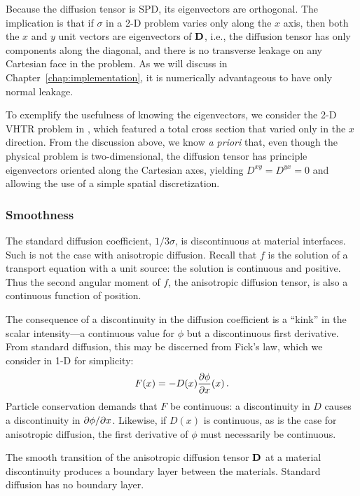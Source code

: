 Because the diffusion tensor is SPD, its eigenvectors are orthogonal. The
implication is that if $\sigma$ in a 2-D problem varies only along
the $x$ axis, then both the $x$ and $y$ unit vectors are
eigenvectors of $\mathbf{D}$, i.e., the diffusion tensor has only
components along the diagonal, and there is no transverse leakage on any
Cartesian face in the problem. As we will discuss in
Chapter~\ref{chap:implementation}, it is numerically advantageous to have only
normal leakage.

To exemplify the usefulness of knowing the eigenvectors, we consider the 2-D
VHTR problem in \cite{Lar2009c}, which featured a total cross section that
varied only in the $x$ direction. From the discussion above, we know
\emph{a priori} that, even though the physical problem is two-dimensional,
the diffusion tensor has principle
eigenvectors oriented along the Cartesian axes, yielding $D^{xy}=D^{yx}=0$ and
allowing the use of a simple spatial discretization.

\subsubsection{Smoothness}

The standard diffusion coefficient, $1/3\sigma$, is discontinuous at material
interfaces. Such is not the case with anisotropic diffusion. Recall that $f$ is
the solution of a transport equation with a unit source: the solution is
continuous and positive. Thus the second angular moment of $f$, the
anisotropic diffusion tensor, is also a continuous function of position.

The consequence of a discontinuity in the diffusion coefficient is a ``kink'' in
the scalar intensity---a continuous value for $\phi$ but a discontinuous first
derivative. From standard diffusion, this may be discerned from Fick's law,
which we consider in 1-D for simplicity:
\begin{equation*}
  F(x) = - D(x) \frac{\partial \phi}{\partial x}(x)\,.
\end{equation*}
Particle conservation demands that $F$ be continuous: a discontinuity in $D$
causes a discontinuity in ${\partial \phi}/{\partial x}$.
Likewise, if $D(x)$ is continuous, as is the case for anisotropic diffusion, the
first derivative of $\phi$ must necessarily be continuous.

The smooth transition of the anisotropic diffusion tensor $\mathbf{D}$ at a material
discontinuity produces a boundary layer between the materials. Standard
diffusion has no boundary layer.

